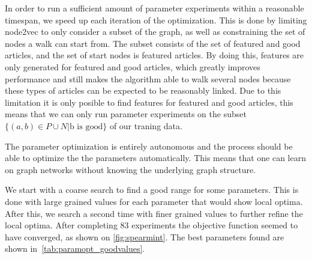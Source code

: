In order to run a sufficient amount of parameter experiments within a reasonable timespan, we speed up each iteration of the optimization.
This is done by limiting node2vec to only consider a subset of the graph, as well as constraining the set of nodes a walk can start from. The subset consists of the set of featured and good articles, and the set of start nodes is featured articles. By doing this, features are only generated for featured and good articles, which greatly improves performance and still makes the algorithm able to walk several nodes because these types of articles can be expected to be reasonably linked. Due to this limitation it is only posible to find features for featured and good articles, this means that we can only run parameter experiments on the subset $\{(a,b) \in P \cup N | \text{b is good}\}$ of our traning data.

The parameter optimization is entirely autonomous and the process should be able to optimize the the parameters automatically. This means that one can learn on graph networks without knowing the underlying graph structure.

We start with a coarse search to find a good range for some parameters. This is done with large grained values for each parameter that would show local optima. After this, we search a second time with finer grained values to further refine the local optima. After completing 83 experiments the objective function seemed to have converged, as shown on \cref{fig:spearmint}. The best parameters found are shown in~\cref{tab:paramopt_goodvalues}.

